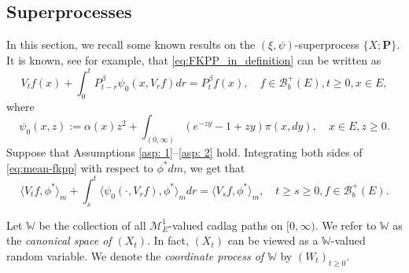 \documentclass[12pt, a4paper]{amsart}
\theoremstyle{definition}
\numberwithin{equation}{section}
\begin{document}
\subsection{Superprocesses}
\label{sec: Superprocesses}
	In this section, we recall some known results on the $(\xi, \psi)$-superprocess $\{X; \mathbf P\}$.
	It is known, see \cite[Theorem 2.23]{Li2011Measure-valued} for example, that \eqref{eq:FKPP_in_definition} can be written as
\[\label{eq:mean-fkpp}
	V_t f(x) + \int_0^t P^\beta_{t-r} \psi_0(x,V_r f) dr
	= P^\beta_t f(x),
	\quad f \in \mathscr B^+_b(E), t \geq 0,x \in E,
\]
	where
\[
	\psi_0(x,z)
	:= \alpha(x) z^2 + \int_{(0,\infty)} (e^{-z y} - 1 + z y) \pi(x,dy),
	\quad x \in E,z \geq 0.
\]
    Suppose that Assumptions \ref{asp: 1}--\ref{asp: 2} hold. 
    Integrating both sides of \eqref{eq:mean-fkpp}  with respect to  $\phi^*dm$, we get that
\[\label{eq:langleVtfphiranglem_equation}
	\langle V_tf,\phi^*\rangle_m + \int_s^t \langle \psi_0(\cdot ,V_r f) , \phi^*\rangle_mdr
	= \langle V_sf,\phi^*\rangle_m,
	\quad t\geq s\geq 0, f\in \mathscr B^+_b(E).
\]

	Let $\mathbb W$ be the collection of all $\mathcal M^1_E$-valued cadlag paths on $[0,\infty)$.
	We refer to $\mathbb W$ as the 
	\emph{canonical space of $(X_t)$}.
	In fact, $(X_t)$ can be viewed
	as a $\mathbb W$-valued random variable.
	We denote the \emph{coordinate process of $\mathbb W$} by $(W_t)_{t\geq 0}$.
\end{document}
